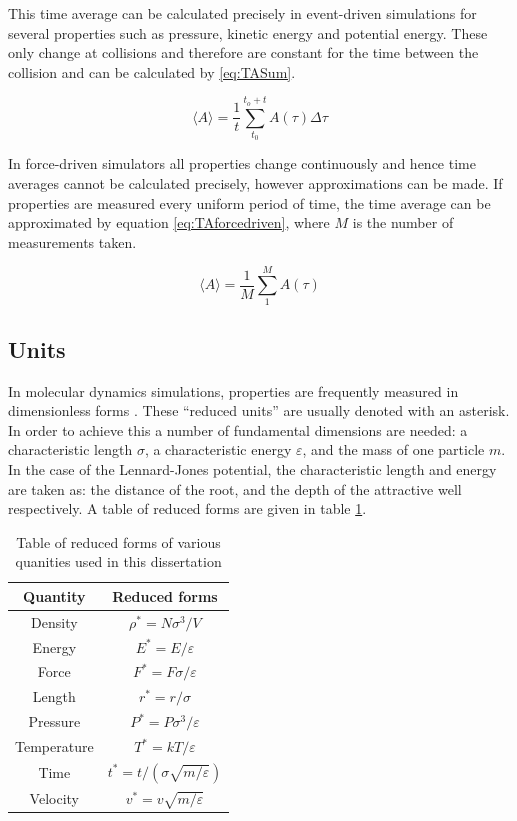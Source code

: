 \message{ !name(main.tex)}\documentclass[12pt]{UoAthesis}
\begin{document}
This time average can be calculated precisely in event-driven
simulations for several properties such as pressure, kinetic energy
and potential energy.  These only change at collisions and therefore
are constant for the time between the collision and can be calculated
by \eqref{eq:TASum}.

\begin{equation}
  \label{eq:TASum}
  \langle A \rangle = \frac{1}{t}\sum^{t_o+t}_{t_0}A(\tau)\Delta \tau
\end{equation}

In force-driven simulators all properties change continuously and
hence time averages cannot be calculated precisely, however
approximations can be made. If properties are measured every uniform
period of time, the time average can be approximated by equation
\eqref{eq:TAforcedriven}, where $M$ is the number of measurements
taken.

\begin{equation}
  \label{eq:TAforcedriven}
  \langle A \rangle = \frac{1}{M} \sum^{M}_{1}A(\tau)
\end{equation}
\subsection{Units}

In molecular dynamics simulations, properties are frequently measured
in dimensionless forms \cite{Haile1997}. These ``reduced units'' are
usually denoted with an asterisk.  In order to achieve this a number
of fundamental dimensions are needed: a characteristic length $\sigma$, a
characteristic energy $\varepsilon$, and the mass of one particle $m$.  In the case of
the Lennard-Jones potential, the characteristic length and energy are
taken as: the distance of the root, and the depth of the attractive
well respectively. A table of reduced forms are given in table
\ref{tab:reducedForms}.

\begin{table}[htp] 
  \caption{Table of reduced forms of various quanities used in this
    dissertation \cite{Haile1997}}
  \label{tab:reducedForms}
  \begin{center}
    \begin{tabular}{c c}
      \toprule
      Quantity & Reduced forms \\
      \midrule
      Density & $\rho^* = N \sigma^3 / V$ \\
      Energy & $E^* = E / \varepsilon$ \\
      Force & $F^* = F\sigma/\varepsilon$ \\
      Length & $r^* = r / \sigma$ \\
      Pressure & $P^* = P \sigma^3 /\varepsilon$ \\
      Temperature & $T^* = kT/\varepsilon$ \\
      Time & $t^* = t / (\sigma \sqrt{m/\varepsilon})$ \\
      Velocity & $v^* = v\sqrt{m/\varepsilon}$ \\
      \bottomrule
    \end{tabular}
  \end{center}
\end{table}
\end{document}
